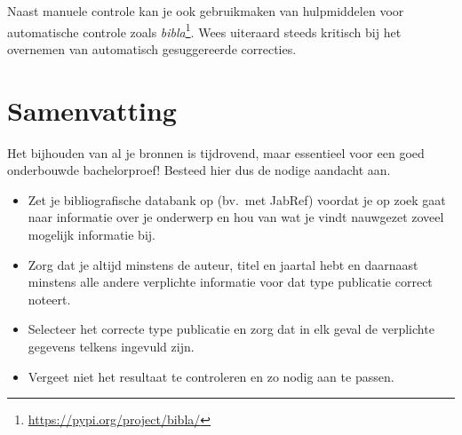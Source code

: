   Naast manuele controle kan je ook gebruikmaken van hulpmiddelen voor automatische controle zoals \emph{bibla}\footnote{\url{https://pypi.org/project/bibla/}}. Wees uiteraard steeds kritisch bij het overnemen van automatisch gesuggereerde correcties.

\section{Samenvatting}%
\label{sec:bibliografie-samenvatting}

Het bijhouden van al je bronnen is tijdrovend, maar essentieel voor een goed onderbouwde bachelorproef! Besteed hier dus de nodige aandacht aan.

\begin{itemize}
  \item Zet je bibliografische databank op (bv.\ met JabRef) voordat je op zoek gaat naar informatie over je onderwerp en hou van wat je vindt nauwgezet zoveel mogelijk informatie bij.
  \item Zorg dat je altijd minstens de auteur, titel en jaartal hebt en daarnaast minstens alle andere verplichte informatie voor dat type publicatie correct noteert.
  \item Selecteer het correcte type publicatie en zorg dat in elk geval de verplichte gegevens telkens ingevuld zijn.
  \item Vergeet niet het resultaat te controleren en zo nodig aan te passen.
\end{itemize}
